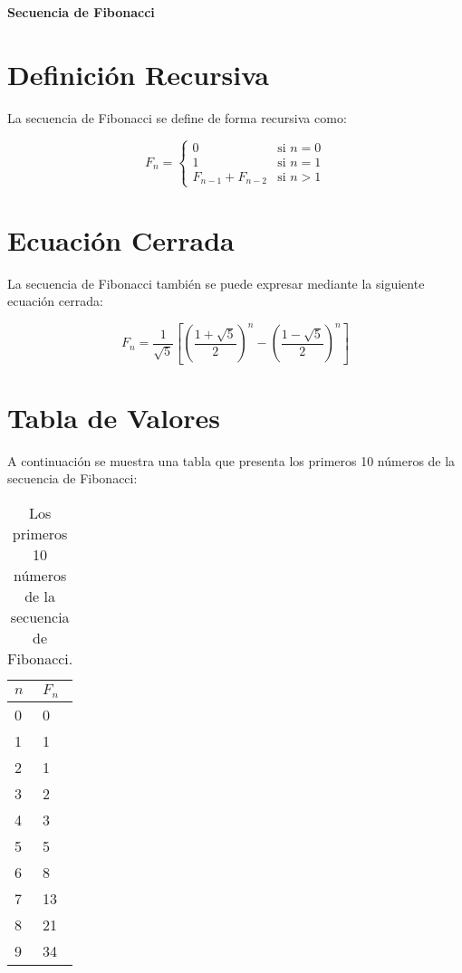 \documentclass{article}
\begin{document}
\begin{center}
  {\LARGE \textbf{Secuencia de Fibonacci}}
\end{center}

\section{Definición Recursiva}

La secuencia de Fibonacci se define de forma recursiva como:

\begin{equation*}
    F_n = \begin{cases}
               0 & \text{si } n = 0 \\
               1 & \text{si } n = 1 \\
               F_{n-1} + F_{n-2} & \text{si } n > 1
           \end{cases}
\end{equation*}

\section{Ecuación Cerrada}

La secuencia de Fibonacci también se puede expresar mediante la siguiente ecuación cerrada:

\begin{equation*}
    F_n = \frac{1}{\sqrt{5}}\left[\left(\frac{1 + \sqrt{5}}{2}\right)^n - \left(\frac{1 - \sqrt{5}}{2}\right)^n\right]
\end{equation*}

\section{Tabla de Valores}

A continuación se muestra una tabla que presenta los primeros 10 números de la secuencia de Fibonacci:

\begin{table}[h]
\centering
\begin{tabular}{@{}ll@{}}
\toprule
$n$ & $F_n$ \\ \midrule
0 & 0 \\
1 & 1 \\
2 & 1 \\
3 & 2 \\
4 & 3 \\
5 & 5 \\
6 & 8 \\
7 & 13 \\
8 & 21 \\
9 & 34 \\ \bottomrule
\end{tabular}
\caption{Los primeros 10 números de la secuencia de Fibonacci.}
\end{table}
\end{document}
